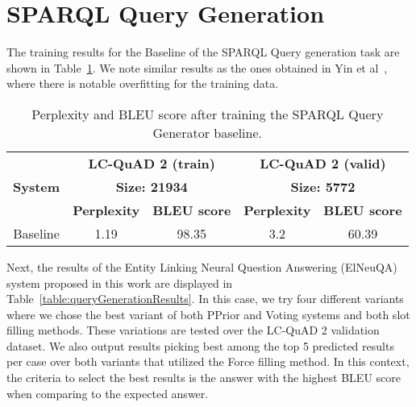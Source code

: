 \section{SPARQL Query Generation}
\label{cap5:results/sparqlQuery}

The training results for the Baseline of the SPARQL Query generation task are shown in 
Table~\ref{table:queryGenerationTraining}. We note similar results as the ones obtained in 
Yin et al~\cite{nmt:nl-to-sparql-Yin19}, where there is notable overfitting for the training data.

\begin{table}[h!]
    \centering
    \begin{tabular}{|c|cc|cc|}
    \hline
    \multirow{3}{*}{\textbf{System}} & \multicolumn{2}{c|}{\textbf{LC-QuAD 2 (train)}}                         & \multicolumn{2}{c|}{\textbf{LC-QuAD 2 (valid)}}                         \\ \cline{2-5} 
                                     & \multicolumn{2}{c|}{\textbf{Size: 21934}}                               & \multicolumn{2}{c|}{\textbf{Size: 5772}}                                \\ \cline{2-5} 
                                     & \multicolumn{1}{c|}{\textbf{Perplexity}} & \textbf{BLEU score} & \multicolumn{1}{c|}{\textbf{Perplexity}} & \textbf{BLEU score} \\ \hline
    Baseline                         & 1.19                                     & 98.35               & 3.2                                      & 60.39               \\ \hline
    \end{tabular}%
    \caption{Perplexity and BLEU score after training the SPARQL Query Generator baseline.}
    \label{table:queryGenerationTraining}
\end{table}

Next, the results of the Entity Linking Neural Question Answering (ElNeuQA) system proposed in 
this work are displayed in Table~\ref{table:queryGenerationResults}. In this case, we try four 
different variants where we chose the best variant of both PPrior and Voting systems and both 
slot filling methods. These variations are tested over the LC-QuAD 2 validation dataset. We also 
output results picking best among the top 5 predicted results per case over both variants that 
utilized the Force filling method. In this context, the criteria to select the best results is 
the answer with the highest BLEU score when comparing to the expected answer.

